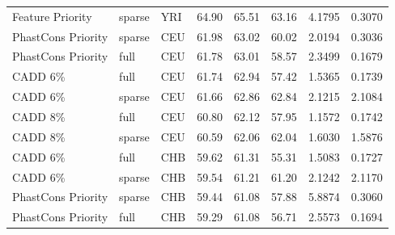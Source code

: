 \documentclass[11pt]{article}
\begin{document}
\begin{table}
\begin{tabular}{lll|crr|cc}
  Feature Priority &            sparse &          YRI &                        64.90 &             65.51 &            63.16 &                                 4.1795 &                                0.3070 \\
PhastCons Priority &            sparse &          CEU &                        61.98 &             63.02 &            60.02 &                                 2.0194 &                                0.3036 \\
PhastCons Priority &              full &          CEU &                        61.78 &             63.01 &            58.57 &                                 2.3499 &                                0.1679 \\
          CADD 6\% &              full &          CEU &                        61.74 &             62.94 &            57.42 &                                 1.5365 &                                0.1739 \\
          CADD 6\% &            sparse &          CEU &                        61.66 &             62.86 &            62.84 &                                 2.1215 &                                2.1084 \\
          CADD 8\% &              full &          CEU &                        60.80 &             62.12 &            57.95 &                                 1.1572 &                                0.1742 \\
          CADD 8\% &            sparse &          CEU &                        60.59 &             62.06 &            62.04 &                                 1.6030 &                                1.5876 \\
          CADD 6\% &              full &          CHB &                        59.62 &             61.31 &            55.31 &                                 1.5083 &                                0.1727 \\
          CADD 6\% &            sparse &          CHB &                        59.54 &             61.21 &            61.20 &                                 2.1242 &                                2.1170 \\
PhastCons Priority &            sparse &          CHB &                        59.44 &             61.08 &            57.88 &                                 5.8874 &                                0.3060 \\
PhastCons Priority &              full &          CHB &                        59.29 &             61.08 &            56.71 &                                 2.5573 &                                0.1694 \\

\end{tabular}
\end{table}
\end{document}
